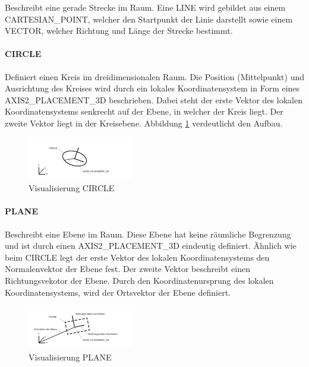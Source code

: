 Beschreibt eine gerade Strecke im Raum. Eine LINE wird gebildet aus einem CARTESIAN\_POINT, welcher den Startpunkt der Linie darstellt sowie einem VECTOR, welcher Richtung und Länge der Strecke bestimmt. 

\paragraph{CIRCLE}

Definiert einen Kreis im dreidimensionalen Raum. Die Position (Mittelpunkt) und Ausrichtung des Kreises wird durch ein lokales Koordinatensystem in Form eines AXIS2\_PLACEMENT\_3D beschrieben. Dabei steht der erste Vektor des lokalen Koordinatensystems senkrecht auf der Ebene, in welcher der Kreis liegt. Der zweite Vektor liegt in der Kreisebene. Abbildung \ref{fig:circleentity} verdeutlicht den Aufbau. 

\begin{figure}[h]
	\centering
	
	\includegraphics[width=0.7\linewidth]{img/circle_entity.pdf}
	
	
	\caption{Visualisierung CIRCLE}
	\label{fig:circleentity}
\end{figure} 

\paragraph{PLANE}

Beschreibt eine Ebene im Raum. Diese Ebene hat keine räumliche Begrenzung und ist durch einen AXIS2\_PLACEMENT\_3D eindeutig definiert. Ähnlich wie beim CIRCLE legt der erste Vektor des lokalen Koordinatensystems den Normalenvektor der Ebene fest. Der zweite Vektor beschreibt einen Richtungsvekotor der Ebene. Durch den Koordinatenursprung des lokalen Koordinatensystems, wird der Ortsvektor der Ebene definiert. 

\begin{figure}[h]
	\centering
	
	\includegraphics[width=0.7\linewidth]{img/plane_entity.pdf}
	
	
	\caption{Visualisierung PLANE}
	
\end{figure} 

